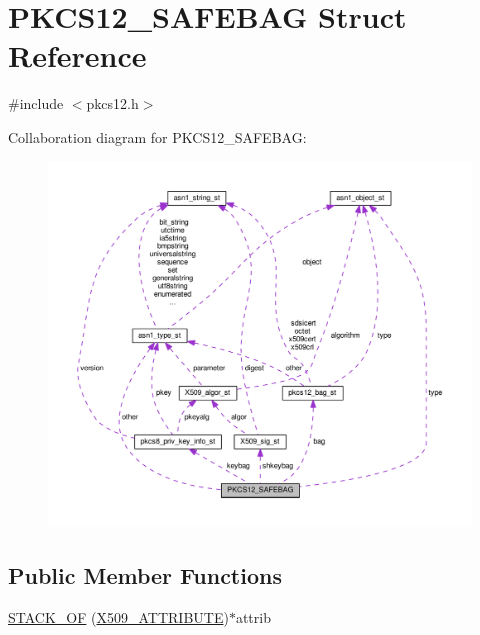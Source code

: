 \hypertarget{struct_p_k_c_s12___s_a_f_e_b_a_g}{}\section{P\+K\+C\+S12\+\_\+\+S\+A\+F\+E\+B\+AG Struct Reference}
\label{struct_p_k_c_s12___s_a_f_e_b_a_g}


{\ttfamily \#include $<$pkcs12.\+h$>$}



Collaboration diagram for P\+K\+C\+S12\+\_\+\+S\+A\+F\+E\+B\+AG\+:
\nopagebreak
\begin{figure}[H]
\begin{center}
\leavevmode
\includegraphics[width=350pt]{struct_p_k_c_s12___s_a_f_e_b_a_g__coll__graph}
\end{center}
\end{figure}
\subsection*{Public Member Functions}
\begin{DoxyCompactItemize}
\item 
\hyperlink{struct_p_k_c_s12___s_a_f_e_b_a_g_a36b65bc2ddacef551ca40bff5bc21d96}{S\+T\+A\+C\+K\+\_\+\+OF} (\hyperlink{x509_8h_aa4f1a62a9d2dd8cb6780fe2713737c0f}{X509\+\_\+\+A\+T\+T\+R\+I\+B\+U\+TE})$\ast$attrib
\end{DoxyCompactItemize}
